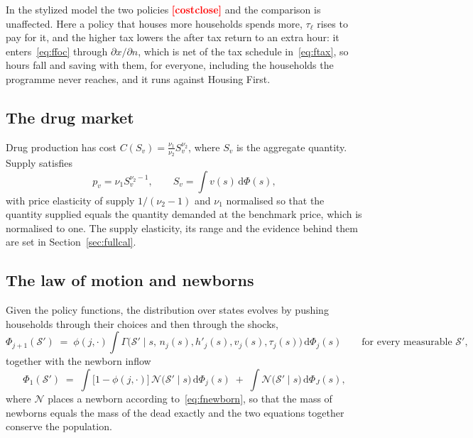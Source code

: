 \documentclass[10pt]{article}
\begin{document}
In the stylized model the two policies
\textcolor{red}{\textbf{[costclose]}} and the comparison
is unaffected. Here a policy that houses more households spends more,
$\tau_{\ell}$ rises to pay for it, and the higher tax lowers the after tax
return to an extra hour: it enters~\eqref{eq:ffoc} through
$\partial x/\partial n$, which is net of the tax schedule
in~\eqref{eq:ftax}, so hours fall and saving with them, for everyone,
including the households the programme never reaches,
and it runs against Housing First.

\subsection{The drug market}

Drug production has cost $C(S_v)=\frac{\nu_1}{\nu_2}S_v^{\nu_2}$, where
$S_v$ is the aggregate quantity. Supply satisfies
\begin{equation}\label{eq:fdrug}
p_v=\nu_1 S_v^{\nu_2-1},
\qquad S_v=\int v(s)\,\mathrm{d}\Phi(s),
\end{equation}
with price elasticity of supply $1/(\nu_2-1)$ and $\nu_1$ normalised so
that the quantity supplied equals the quantity demanded at the benchmark
price, which is normalised to one. The supply elasticity, its range
and the evidence behind them are set in Section~\ref{sec:fullcal}.

\subsection{The law of motion and newborns}\label{sec:fnewbornsec}

Given the policy functions, the distribution over states evolves by pushing
households through their choices and then through the shocks,
\begin{equation}\label{eq:flom}
\Phi_{j+1}(\mathcal S')\;=\;\phi(j,\cdot)\!\int
\Gamma\big(\mathcal S'\mid s,\,n_j(s),h'_j(s),v_j(s),\tau_j(s)\big)\,
\mathrm{d}\Phi_j(s)
\qquad\text{for every measurable } \mathcal S' ,
\end{equation}
together with the newborn inflow
\begin{equation}\label{eq:flomnew}
\Phi_{1}(\mathcal S')\;=\;\int\big[1-\phi(j,\cdot)\big]\,
\mathcal N\big(\mathcal S'\mid s\big)\,\mathrm{d}\Phi_j(s)
\;+\;\int \mathcal N\big(\mathcal S'\mid s\big)\,\mathrm{d}\Phi_J(s),
\end{equation}
where $\mathcal N$ places a newborn according to~\eqref{eq:fnewborn}, so that
the mass of newborns equals the mass of the dead exactly and the two equations
together conserve the population.
\end{document}
